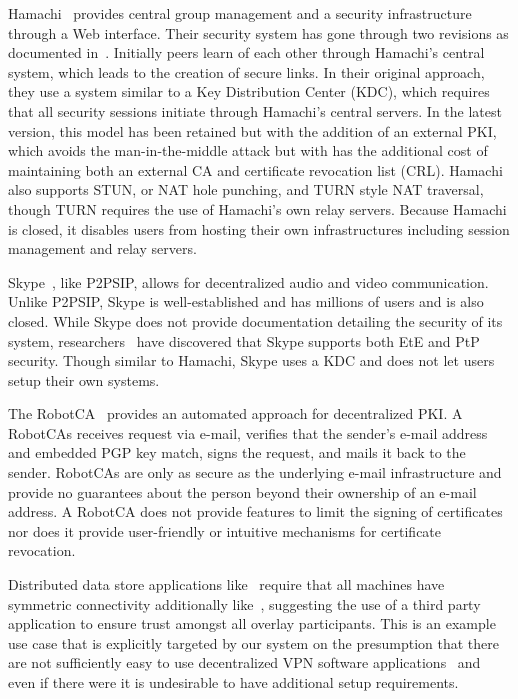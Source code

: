 Hamachi~\cite{hamachi} provides central group management and a security
infrastructure through a Web interface.  Their security system has gone through
two revisions as documented in~\cite{hamachi_security}.  Initially peers learn
of each other through Hamachi's central system, which leads to the creation of
secure links.  In their original approach, they use a system similar to a Key
Distribution Center (KDC), which requires that all security sessions initiate
through Hamachi's central servers.  In the latest version, this model has been
retained but with the addition of an external PKI, which avoids the
man-in-the-middle attack but with has the additional cost of maintaining both
an external CA and certificate revocation list (CRL).  Hamachi also supports
STUN, or NAT hole punching, and TURN style NAT traversal, though TURN requires
the use of Hamachi's own relay servers.  Because Hamachi is closed, it disables
users from hosting their own infrastructures including session management and
relay servers.

Skype~\cite{skype}, like P2PSIP, allows for decentralized audio and video
communication. Unlike P2PSIP, Skype is well-established and has millions of
users and is also closed.  While Skype does not provide documentation detailing
the security of its system, researchers~\cite{skype_auth, skype_overview} have
discovered that Skype supports both EtE and PtP security.  Though similar to
Hamachi, Skype uses a KDC and does not let users setup their own systems.

The RobotCA~\cite{robotca} provides an automated approach for decentralized
PKI.  A RobotCAs receives request via e-mail, verifies that the sender's e-mail
address and embedded PGP key match, signs the request, and mails it back to the
sender.  RobotCAs are only as secure as the underlying e-mail infrastructure
and provide no guarantees about the person beyond their ownership of an e-mail
address.  A RobotCA does not provide features to limit the signing of
certificates nor does it provide user-friendly or intuitive mechanisms for
certificate revocation.

Distributed data store applications like~\cite{dynamo, bigtable} require that
all machines have symmetric connectivity additionally like~\cite{past}, suggesting
the use of a third party application to ensure trust amongst all overlay
participants.  This is an example use case that is explicitly targeted by our
system on the presumption that there are not sufficiently easy to use
decentralized VPN software applications~\cite{sc09, nsdi10} and even if there
were it is undesirable to have additional setup requirements.


